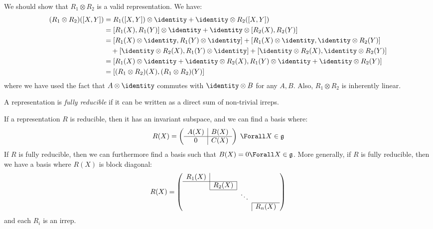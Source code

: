\documentclass{jknotes}
\begin{document}
\begin{unlectured}
    We should show that \(R_1\otimes R_2\) is a valid representation. We have:
    \begin{align}
        (R_1\otimes R_2)([X,Y]) &= R_1([X,Y])\otimes\identity + \identity\otimes R_2([X,Y]) \\
        &= [R_1(X),R_1(Y)]\otimes\identity + \identity\otimes [R_2(X),R_2(Y)] \\
        &= [R_1(X)\otimes\identity,R_1(Y)\otimes\identity] + [R_1(X)\otimes\identity,\identity\otimes R_2(Y)] \\
        &\quad + [\identity\otimes R_2(X),R_1(Y)\otimes\identity] + [\identity\otimes R_2(X),\identity\otimes R_2(Y)] \\
        &= [R_1(X)\otimes\identity + \identity\otimes R_2(X),R_1(Y)\otimes\identity + \identity\otimes R_2(Y)] \\
        &= [(R_1\otimes R_2)(X), (R_1\otimes R_2)(Y)]
    \end{align}
    where we have used the fact that \(A\otimes\identity\) commutes with \(\identity\otimes B\) for any \(A,B\). Also, \(R_1\otimes R_2\) is inherently linear.
\end{unlectured}

\begin{defn}
    A representation is \emph{fully reducible} if it can be written as a direct sum of non-trivial irreps.
\end{defn}
If a representation \(R\) is reducible, then it has an invariant subspace, and we can find a basis where:
\begin{equation}
    R(X) = \left(
    \begin{array}{c|c}
        A(X) & B(X) \\ \hline
        0 & C(X)
    \end{array}
    \right) \; \Forall X \in \mathfrak{g}
\end{equation}
If \(R\) is fully reducible, then we can furthermore find a basis such that \(B(X) = 0 \Forall X \in \mathfrak{g}\). More generally, if \(R\) is fully reducible, then we have a basis where \(R(X)\) is block diagonal:
\begin{equation}
    R(X) = \left(
    \begin{array}{cccc}
        R_1(X) & \multicolumn{1}{|c}{}\\
        \cline{1-2}
        & \multicolumn{1}{|c|}{R_2(X)} \\
        \cline{2-2}
        && \ddots \\
        \cline{4-4}
        &&& \multicolumn{1}{|c}{R_n(X)} \\
    \end{array}
    \right)
\end{equation}
and each \(R_i\) is an irrep.
\end{document}
